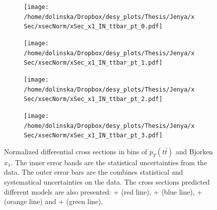 \begin{figure}[p]
\centering
\begin{subfigure}
  \centering
  \texttt{[image: /home/dolinska/Dropbox/desy\_plots/Thesis/Jenya/xSec/xsecNorm/xSec\_x1\_IN\_ttbar\_pt\_0.pdf]}
\end{subfigure}
\begin{subfigure}
  \centering
  \texttt{[image: /home/dolinska/Dropbox/desy\_plots/Thesis/Jenya/xSec/xsecNorm/xSec\_x1\_IN\_ttbar\_pt\_1.pdf]}
\end{subfigure}
\begin{subfigure}
  \centering
  \texttt{[image: /home/dolinska/Dropbox/desy\_plots/Thesis/Jenya/xSec/xsecNorm/xSec\_x1\_IN\_ttbar\_pt\_2.pdf]}
\end{subfigure}
\begin{subfigure}
  \centering
  \texttt{[image: /home/dolinska/Dropbox/desy\_plots/Thesis/Jenya/xSec/xsecNorm/xSec\_x1\_IN\_ttbar\_pt\_3.pdf]}
\end{subfigure}
\caption{Normalized differential cross sections in bins of $p_{T}(t\bar{t})$ and Bjorken $x_{1}$. The inner error bands are the statistical uncertainties from the data.
         The outer error bars are the combines statistical and systematical uncertainties on the data. The cross sections predicted different models are also presented:
         \MG + \PYTHIA (red line), \Powheg + \PYTHIA (blue line), \Powheg + \HERWIG (orange line) and \MCNLO + \HERWIG (green line).}
\label{fig:XS_2D_x1_pttt1}
\end{figure}



